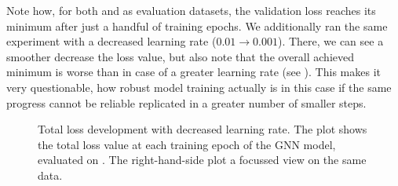 \documentclass[
	fontsize=10pt, %
	twoside=false, %
	secnumdepth=1, %
  toc=indentunnumbered %
]{kaobook}
\begin{document}
Note how, for both \PDMap and \ReconMap{} as evaluation datasets, the validation
loss reaches its minimum after just a handful of training epochs. We
additionally ran the same experiment with a decreased learning rate ($0.01
\rightarrow 0.001$). There, we can see a smoother decrease the loss value, but
also note that the overall achieved minimum is worse than in case of a greater
learning rate (see ). This makes it
very questionable, how robust model training actually is in this case if the
same progress cannot be reliable replicated in a greater number of smaller steps.
\begin{figure}[h]
  \centering
  \begin{subfigure}[h]{0.49\linewidth}
  \end{subfigure}
  \begin{subfigure}[h]{0.49\linewidth}
  \end{subfigure}
  \caption{Total loss development with decreased learning rate. The plot shows
    the total loss value at each training epoch of the GNN model, evaluated on
    \ReconMap{}. The right-hand-side plot a focussed view on the same data.}
  \label{fig:svm-repro-lowlr-reconmapolder-loss}
\end{figure}
\end{document}
